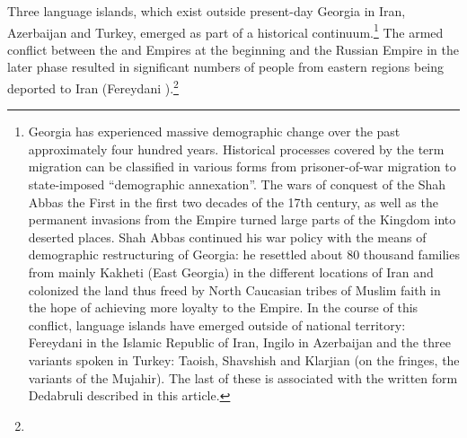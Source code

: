 \documentclass[output=paper,colorlinks,citecolor=brown,arabicfont,georgian]{langscibook}
\begin{document}
Three  language islands, which exist outside present-day Georgia in Iran, Azerbaijan and Turkey, emerged as part of a historical continuum.\footnote{%
Georgia has experienced massive demographic change over the past approximately four hundred years. Historical processes covered by the term migration can be classified in various forms from prisoner-of-war migration to state-imposed ``demographic annexation''. The wars of conquest of the  Shah Abbas the First in the first two decades of the 17th century, as well as the permanent invasions from the  Empire turned large parts of the  Kingdom into deserted places. Shah Abbas continued his war policy with the means of demographic restructuring of Georgia: he resettled about 80 thousand families from mainly Kakheti (East Georgia) in the different locations of Iran and colonized the land thus freed by North Caucasian tribes of Muslim faith in the hope of achieving more loyalty to the  Empire. In the course of this conflict,  language islands have emerged outside of  national territory: Fereydani  in the Islamic Republic of Iran, Ingilo  in Azerbaijan and the three variants spoken in Turkey: Taoish, Shavshish and Klarjian (on the fringes, the variants of the  Mujahir). The last of these is associated with the written form Dedabruli described in this article.} The armed conflict between the  and  Empires at the beginning and the Russian Empire in the later phase resulted in significant numbers of people from eastern  regions being deported to Iran (Fereydani ).\footnote{%
}
\end{document}
